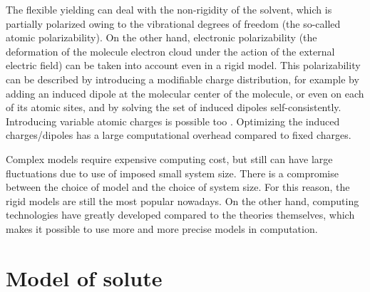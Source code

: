 The flexible yielding can deal with the non-rigidity of the solvent,
which is partially polarized owing to the vibrational degrees of freedom
(the so-called atomic polarizability). On the other hand, electronic
polarizability (the deformation of the molecule electron cloud under
the action of the external electric field) can be taken into account
even in a rigid model. This polarizability can be described by introducing
a modifiable charge distribution, for example by adding an induced
dipole at the molecular center of the molecule, or even on each of
its atomic sites, and by solving the set of induced dipoles self-consistently.
Introducing variable atomic charges is possible too \citep{Berne_1994}.
Optimizing the induced charges/dipoles has a large computational overhead
compared to fixed charges.

Complex models require expensive computing cost, but still can have
large fluctuations due to use of imposed small system size. There
is a compromise between the choice of model and the choice of system
size. For this reason, the rigid models are still the most
popular nowadays. On the other hand, computing technologies have greatly developed
compared to the theories themselves, which makes it possible to use
more and more precise models in computation. 

\section{Model of solute}

